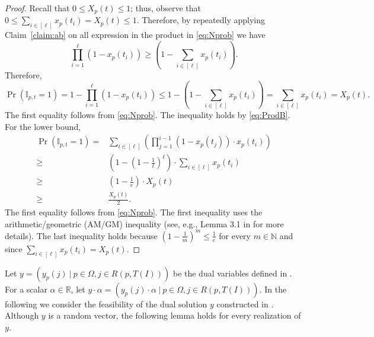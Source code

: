 \documentclass[11pt]{article}
\newcommand{\op}{{\mathbb{I}_{p,t}}}
\newcommand{\om}{{\Omega}}
\begin{document}
{\begin{proof}
Recall that $0 \leq X_p(t) \leq 1$; thus, observe that $0 \leq \sum_{i \in [\ell]} x_p(t_i) = X_p(t) \leq 1$. Therefore, by repeatedly applying Claim~\ref{claim:ab} on all expression in the product in \eqref{eq:Nprob} we have 
	\begin{equation}
		\label{eq:ProdB}
	 \prod_{i = 1}^{\ell} \left( 1-x_p(t_i) \right) \geq \left( 1- \sum_{i \in [\ell]} x_p(t_i)\right). 
	\end{equation}
	Therefore, 
	\begin{equation*}
		\label{eq:UB}
			\Pr \left(   \op = 1 \right) =  1- \prod_{i = 1}^{\ell} \left( 1-x_p(t_i) \right) \leq 1-\left( 1- \sum_{i \in [\ell]} x_p(t_i)\right) =  \sum_{i \in [\ell]} x_p(t_i) = X_p(t). 
	\end{equation*} The first equality follows from \eqref{eq:Nprob}. The inequality holds by \eqref{eq:ProdB}. For the lower bound, 
	\begin{equation*}
		\label{eq:LB}
		\begin{aligned}
			\Pr \left(   \op = 1 \right) ={} & \sum_{i \in [\ell]} \left( \prod_{j = 1}^{i-1} \left( 1-x_p(t_j) \right) \cdot x_p(t_i) \right) \\
			\geq{} & \left( 1-\left( 1-\frac{1}{\ell}\right)^{\ell}\right) \cdot \sum_{i \in [\ell]}  x_p(t_i) \\
			\geq{} & \left(1-\frac{1}{e}\right) \cdot X_p(t) \\
			\geq{} & \frac{X_p(t)}{2}. 
		\end{aligned}
	\end{equation*} The first equality follows from \eqref{eq:Nprob}. The first inequality uses the arithmetic/geometric (AM/GM) inequality (see, e.g., Lemma 3.1 in \cite{goemans1994new} for more details). The last inequality holds because $\left( 1-\frac{1}{m}\right)^{m} \leq \frac{1}{e}$ for every $m \in \mathbb{N}$ and since $\sum_{i \in [\ell]} x_p(t_i) = X_p(t)$.  
\end{proof}




Let $y = \left( y_p(j)~|~p \in \om, j \in R(p,T(I))\right)$ be the dual variables defined in . For a scalar $\alpha \in \mathbb{R}$, let $y \cdot \alpha =  \left( y_p(j) \cdot \alpha~|~p \in \om, j \in R(p,T(I))\right)$. In the following we consider the feasibility of the dual solution $y$ constructed in . Although $y$ is a random vector, the following lemma holds for every realization of $y$.  

}
\end{document}

